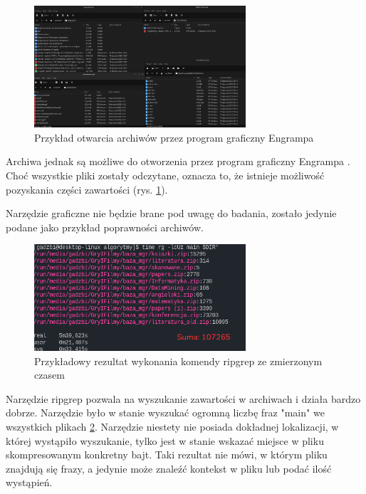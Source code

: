\begin{figure}[h]
\centering
\includegraphics[width=0.7\textwidth]{./images/przykład-otwarcia-archiwów.png}
\caption{Przykład otwarcia archiwów przez program graficzny Engrampa}
\label{fig:engrampaExample}
\end{figure}

Archiwa jednak są możliwe do otworzenia przez program graficzny Engrampa \cite{bib:internet:EngrampaArchives}.
Choć wszystkie pliki zostały odczytane, oznacza to, że istnieje możliwość pozyskania
części zawartości (rys. \ref{fig:engrampaExample}).

Narzędzie graficzne nie będzie brane pod uwagę do badania, zostało jedynie podane
jako przykład poprawności archiwów.

\begin{figure}[h]
\centering
\includegraphics[width=0.7\textwidth]{./images/ripgrep-result-main.png}
\caption{Przykładowy rezultat wykonania komendy ripgrep ze zmierzonym czasem}
\label{fig:ripgrepResultMain}
\end{figure}

Narzędzie ripgrep pozwala na wyszukanie zawartości w archiwach i działa bardzo dobrze.
Narzędzie było w stanie wyszukać ogromną liczbę fraz "main" we wszystkich plikach \ref{fig:ripgrepResultMain}.
Narzędzie niestety nie posiada dokładnej lokalizacji, w której wystąpiło wyszukanie,
tylko jest w stanie wskazać miejsce w pliku skompresowanym konkretny bajt.
Taki rezultat nie mówi, w którym pliku znajdują się frazy, a jedynie może znaleźć 
kontekst w pliku lub podać ilość wystąpień.

